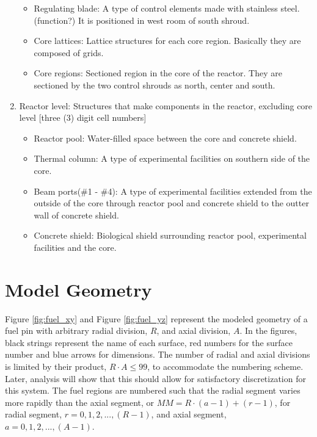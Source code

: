 \documentclass{UWNR_modeling}
\begin{document}
\begin{enumerate}
\begin{itemize}
	\item Regulating blade: A type of control elements made with stainless steel. (function?) It is positioned in west room of south shroud.
	\item Core lattices: Lattice structures for each core region. Basically they are composed of grids.
	\item Core regions: Sectioned region in the core of the reactor. They are sectioned by the two control shrouds as north, center and south.
	\end{itemize}
\item Reactor level: Structures that make components in the reactor, excluding core level [three (3) digit cell numbers]
	\begin{itemize}
	\item Reactor pool: Water-filled space between the core and concrete shield.
	\item Thermal column: A type of experimental facilities on southern side of the core.
	\item Beam ports(\#1 - \#4): A type of experimental facilities extended from the outside of the core through reactor pool and concrete shield to the outter wall of concrete shield.
	\item Concrete shield: Biological shield surrounding reactor pool, experimental facilities and the core.
\end{itemize}
\end{enumerate}

\section{Model Geometry}\label{section:geometry}
Figure \ref{fig:fuel_xy} and Figure \ref{fig:fuel_yz} represent the modeled geometry of a fuel pin with arbitrary radial division, $R$, and axial division, $A$. In the figures, black strings represent the name of each surface, red numbers for the surface number and blue arrows for dimensions.  The number of radial and axial divisions is limited by their product, $R \cdot A \leq 99$, to accommodate the numbering scheme.  Later, analysis will show that this should allow for satisfactory discretization for this system. The fuel regions are numbered such that the radial segment varies more rapidly than the axial segment, or $MM = R\cdot(a-1) + (r-1)$, for radial segment, $r = 0, 1, 2, ..., (R-1)$, and axial segment, $a = 0, 1, 2, ..., (A-1)$.
\end{document}
